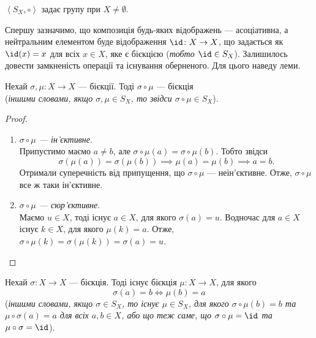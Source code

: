 \documentclass{math_library}
\begin{document}
\begin{theorem}
$\left< S_X, \circ \right>$ задає групу при $X \neq \emptyset$.
\end{theorem}

Спершу зазначимо, що композиція будь-яких відображень --- асоціативна, а нейтральним елементом буде відображення $\id \colon X \to X$, що задається як $\id(x) = x$ для всіх $x \in X$, яке є бієкцією (\textit{тобто $\id \in S_X$}). Залишилось довести замкненість операції та існування оберненого. Для цього наведу леми.

\begin{lemma}
Нехай $\sigma, \mu \colon X \to X$ --- бієкції. Тоді $\sigma \circ \mu$ --- бієкція \\
(\textit{іншими словами, якщо $\sigma, \mu \in S_X$, то звідси $\sigma \circ \mu \in S_X$}).
\end{lemma}

\begin{proof}
\begin{enumerate}[topsep=0pt,label={\Roman*.},wide=0pt]
\item \textit{$\sigma \circ \mu$ --- ін'єктивне}.\\
Припустимо маємо $a \neq b$, але $\sigma \circ \mu (a) = \sigma \circ \mu (b)$. Тобто звідси \[
\sigma (\mu(a)) = \sigma (\mu(b)) \implies \mu(a) = \mu(b) \implies a = b.
\]
Отримали суперечність від припущення, що $\sigma \circ \mu$ --- неін'єктивне. Отже, $\sigma \circ \mu$ все ж таки ін'єктивне.

\item \textit{$\sigma \circ \mu$ --- сюр'єктивне}.\\
Маємо $u \in X$, тоді існує $a \in X$, для якого $\sigma(a) = u$. Водночас для $a \in X$ існує $k \in X$, для якого $\mu(k) = a$. Отже, $\sigma \circ \mu (k) = \sigma(\mu(k)) = \sigma(a) = u$. \qedhere
\end{enumerate}
\end{proof}

\begin{lemma}
Нехай $\sigma \colon X \to X$ --- бієкція. Тоді існує бієкція $\mu \colon X \to X$, для якого 
\[
\sigma(a) = b \iff \mu(b) = a
\]
(\textit{іншими словами, якщо $\sigma \in S_X$, то існує $\mu \in S_X$, для якого $\sigma \circ \mu(b) = b$ та $\mu \circ \sigma(a) = a$ для всіх $a,b \in X$, або що теж саме, що $\sigma \circ \mu = \id$ та $\mu \circ \sigma = \id$}).
\end{lemma}
\end{document}
